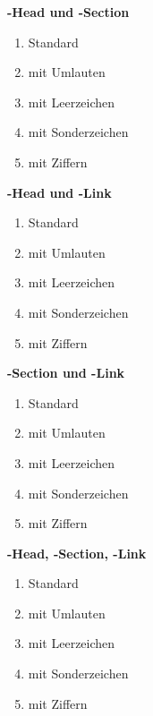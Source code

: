 \pagebreak


\textbf{\SEARCH-Head und \SEARCH-Section} 
\begin{enumerate}
 	\item Standard
  	\item mit Umlauten
	\item mit Leerzeichen
	\item mit Sonderzeichen
	\item mit Ziffern
\end{enumerate}


\textbf{\SEARCH-Head und \SEARCH-Link} 
\begin{enumerate}
   \item Standard
   \item mit Umlauten
   \item mit Leerzeichen
   \item mit Sonderzeichen
   \item mit Ziffern
\end{enumerate}


\textbf{\SEARCH-Section und \SEARCH-Link} 
\begin{enumerate}
   \item Standard
   \item mit Umlauten
   \item mit Leerzeichen
   \item mit Sonderzeichen
   \item mit Ziffern
\end{enumerate}



\textbf{\SEARCH-Head, \SEARCH-Section, \SEARCH-Link}
\begin{enumerate}
   \item Standard
   \item mit Umlauten
   \item mit Leerzeichen
   \item mit Sonderzeichen
   \item mit Ziffern
\end{enumerate}

\pagebreak

